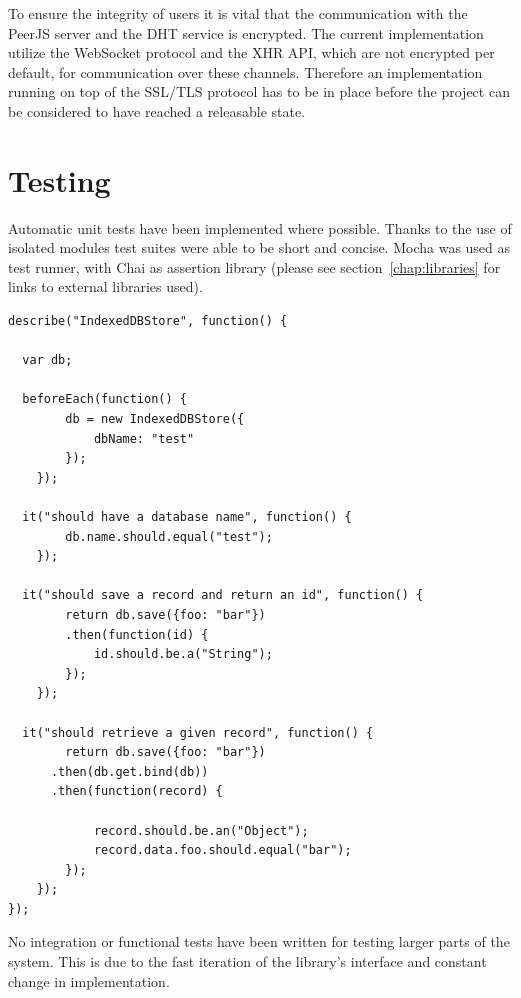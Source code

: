 To ensure the integrity of users it is vital that the communication with the PeerJS server and the DHT service is encrypted. The current implementation utilize the WebSocket protocol and the XHR API, which are not encrypted per default, for communication over these channels. Therefore an implementation running on top of the SSL/TLS protocol has to be in place before the project can be considered to have reached a releasable state.

\section{Testing}
\label{sec:testing}

Automatic unit tests have been implemented where possible. Thanks to the use of isolated modules test suites were able to be short and concise. Mocha was used as test runner, with Chai as assertion library (please see section~\ref{chap:libraries} for links to external libraries used).

\begin{Code}
\begin{lstlisting}[caption={Sample test suite}, label={lst:testsuite}]
describe("IndexedDBStore", function() {

  var db;

  beforeEach(function() {
		db = new IndexedDBStore({
			dbName: "test"
		});
	});

  it("should have a database name", function() {
		db.name.should.equal("test");
	});

  it("should save a record and return an id", function() {
		return db.save({foo: "bar"})
		.then(function(id) {
			id.should.be.a("String");
		});
	});

  it("should retrieve a given record", function() {
		return db.save({foo: "bar"})
      .then(db.get.bind(db))
      .then(function(record) {

			record.should.be.an("Object");
			record.data.foo.should.equal("bar");
		});
	});
});
\end{lstlisting}
\end{Code}

No integration or functional tests have been written for testing larger parts of the system. This is due to the fast iteration of the library's interface and constant change in implementation.
